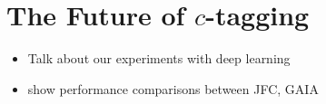 


\section{The Future of $c$-tagging}
\begin{itemize}
\item Talk about our experiments with deep learning
\item  show performance comparisons between JFC, GAIA
\end{itemize}
